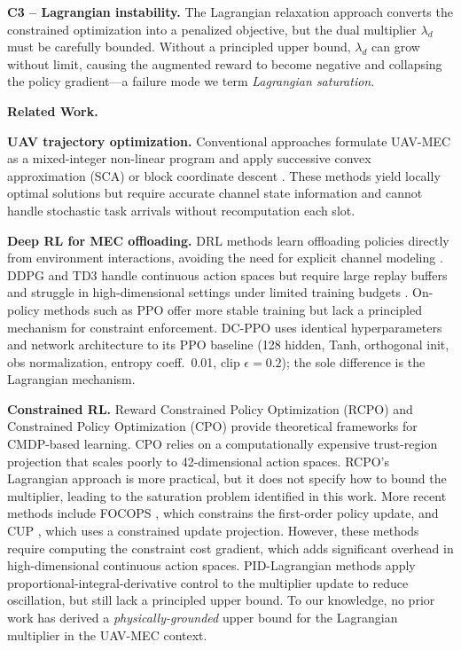 \documentclass[journal]{IEEEtran}
\newcommand{\ld}{\lambda_d}
\begin{document}
\textbf{C3 -- Lagrangian instability.}
The Lagrangian relaxation approach \cite{tessler2019rcpo} converts
the constrained optimization into a penalized objective, but the
dual multiplier $\ld$ must be carefully bounded.
Without a principled upper bound, $\ld$ can grow without limit,
causing the augmented reward to become negative and collapsing
the policy gradient---a failure mode we term
\emph{Lagrangian saturation}.

\noindent\textbf{Related Work.}

\textbf{UAV trajectory optimization.}
Conventional approaches formulate UAV-MEC as a mixed-integer
non-linear program and apply successive convex approximation
(SCA) or block coordinate descent
\cite{zeng2019uav_survey,zhan2020uav_mec,xie2020uav_mec_joint,
cao2021uav_mec_offload}.
These methods yield locally optimal solutions but require
accurate channel state information and cannot handle stochastic
task arrivals without recomputation each slot.

\textbf{Deep RL for MEC offloading.}
DRL methods learn offloading policies directly from environment
interactions, avoiding the need for explicit channel modeling
\cite{luong2019drl_comms,mnih2015dqn}.
DDPG and TD3 handle continuous action spaces but require
large replay buffers and struggle in high-dimensional settings
under limited training budgets \cite{fujimoto2018td3}.
On-policy methods such as PPO offer more stable training but
lack a principled mechanism for constraint enforcement.
DC-PPO uses identical hyperparameters and network architecture
to its PPO baseline (128 hidden, Tanh, orthogonal init,
obs normalization, entropy coeff.\ 0.01, clip $\epsilon{=}0.2$);
the sole difference is the Lagrangian mechanism.

\textbf{Constrained RL.}
Reward Constrained Policy Optimization (RCPO) \cite{tessler2019rcpo}
and Constrained Policy Optimization (CPO) \cite{achiam2017cpo}
provide theoretical frameworks for CMDP-based learning.
CPO relies on a computationally expensive trust-region projection
that scales poorly to 42-dimensional action spaces.
RCPO's Lagrangian approach is more practical, but it does not
specify how to bound the multiplier, leading to the saturation
problem identified in this work.
More recent methods include FOCOPS \cite{zhang2020focops}, which
constrains the first-order policy update, and CUP
\cite{yang2022cup}, which uses a constrained update projection.
However, these methods require computing the constraint cost
gradient, which adds significant overhead in high-dimensional
continuous action spaces.
PID-Lagrangian methods \cite{stooke2020pid_lagrangian} apply
proportional-integral-derivative control to the multiplier update
to reduce oscillation, but still lack a principled upper bound.
To our knowledge, no prior work has derived a
\emph{physically-grounded} upper bound for the Lagrangian
multiplier in the UAV-MEC context.
\end{document}
